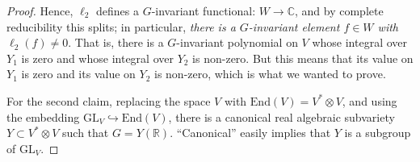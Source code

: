 \begin{proof}
Hence, $\ell_2$ defines a $G$-invariant functional: $W\to \mathbb C$, and by complete reducibility this splits; in particular, \emph{there is a $G$-invariant element $f\in W$ with $\ell_2(f)\ne 0$}. That is, there is a $G$-invariant polynomial on $V$ whose integral over $Y_1$ is zero and whose integral over $Y_2$ is non-zero. But this means that its value on $Y_1$ is zero and its value on $Y_2$ is non-zero, which is what we wanted to prove.

For the second claim, replacing the space $V$ with $\text{End}(V)=V^*\otimes V$, and using the embedding $\text{GL}_V\hookrightarrow \text{End}(V)$, there is a canonical real algebraic subvariety $Y\subset V^*\otimes V$ such that $G = Y(\mathbb R)$. ``Canonical'' easily implies that $Y$ is a subgroup of $\text{GL}_V$.
\end{proof}


